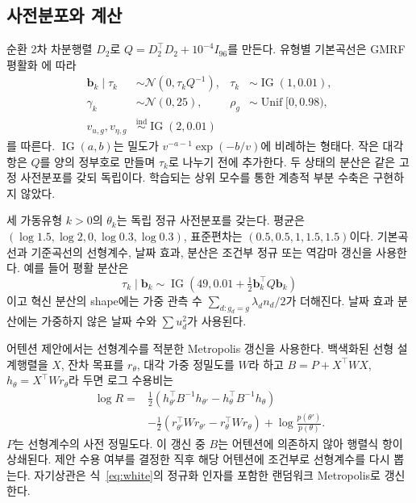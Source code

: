 \documentclass[letterpaper]{article}
\begin{document}
\subsection{사전분포와 계산}
순환 2차 차분행렬 $D_2$로 $Q=D_2^\top D_2+10^{-4}I_{96}$를 만든다. 유형별 기본곡선은 GMRF 평활화 \citep{rue2005gmrf}에 따라
\begin{equation}
\begin{aligned}
\boldsymbol b_k\mid\tau_k&\sim\mathcal N(0,\tau_k Q^{-1}),&
\tau_k&\sim\operatorname{IG}(1,0.01),\\
\gamma_k&\sim\mathcal N(0,25),&
\rho_g&\sim\operatorname{Unif}[0,0.98),\\
v_{u,g},v_{\eta,g}&\stackrel{\mathrm{ind}}{\sim}\operatorname{IG}(2,0.01)
\end{aligned}
\label{eq:priors}
\end{equation}
를 따른다. $\operatorname{IG}(a,b)$는 밀도가 $v^{-a-1}\exp(-b/v)$에 비례하는 형태다. 작은 대각항은 $Q$를 양의 정부호로 만들며 $\tau_k$로 나누기 전에 추가한다. 두 상태의 분산은 같은 고정 사전분포를 갖되 독립이다. 학습되는 상위 모수를 통한 계층적 부분 수축은 구현하지 않았다.

세 가동유형 $k>0$의 $\theta_k$는 독립 정규 사전분포를 갖는다. 평균은 $(\log1.5,\log2,0,\log0.3,\log0.3)$, 표준편차는 $(0.5,0.5,1,1.5,1.5)$이다. 기본곡선과 기준곡선의 선형계수, 날짜 효과, 분산은 조건부 정규 또는 역감마 갱신을 사용한다. 예를 들어 평활 분산은
\begin{equation}
\tau_k\mid\boldsymbol b_k\sim\operatorname{IG}
\left(49,0.01+\tfrac12\boldsymbol b_k^\top Q\boldsymbol b_k\right)
\end{equation}
이고 혁신 분산의 shape에는 가중 관측 수 $\sum_{d:g_d=g}\lambda_dn_d/2$가 더해진다. 날짜 효과 분산에는 가중하지 않은 날짜 수와 $\sum u_d^2$가 사용된다.

어텐션 제안에서는 선형계수를 적분한 Metropolis 갱신을 사용한다. 백색화된 선형 설계행렬을 $X$, 잔차 목표를 $r_\theta$, 대각 가중 정밀도를 $W$라 하고 $B=P+X^\top WX$, $h_\theta=X^\top Wr_\theta$라 두면 로그 수용비는
\begin{equation}
\begin{split}
\log R={}&\tfrac12(h_{\theta'}^\top B^{-1}h_{\theta'}
                         -h_\theta^\top B^{-1}h_\theta)\\
&-\tfrac12(r_{\theta'}^\top Wr_{\theta'}-r_\theta^\top Wr_\theta)
 +\log\frac{p(\theta')}{p(\theta)}.
\end{split}
\label{eq:collapsed}
\end{equation}
$P$는 선형계수의 사전 정밀도다. 이 갱신 중 $B$는 어텐션에 의존하지 않아 행렬식 항이 상쇄된다. 제안 수용 여부를 결정한 직후 해당 어텐션에 조건부로 선형계수를 다시 뽑는다. 자기상관은 식~\eqref{eq:white}의 정규화 인자를 포함한 랜덤워크 Metropolis로 갱신한다.
\end{document}

